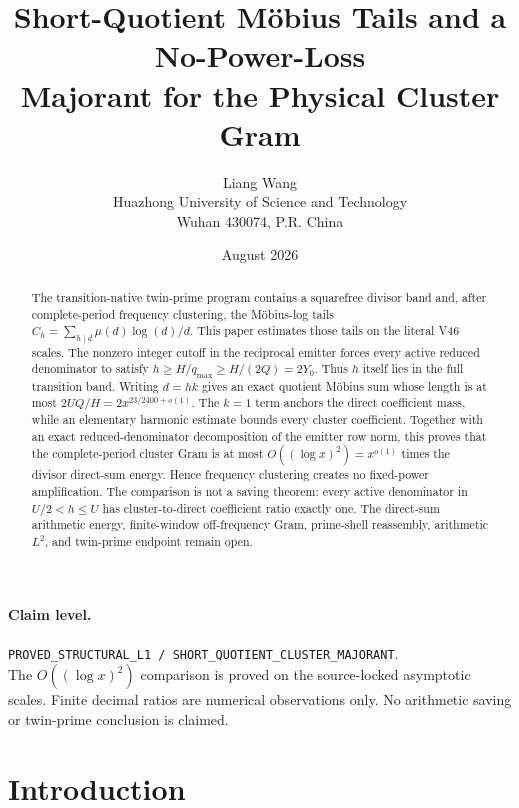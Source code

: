 \documentclass[11pt]{article}
\title{\textbf{Short-Quotient M\"obius Tails and a No-Power-Loss\\
Majorant for the Physical Cluster Gram}}
\author{Liang Wang\\
Huazhong University of Science and Technology\\
Wuhan 430074, P.R. China}
\date{August 2026}
\theoremstyle{definition}
\theoremstyle{remark}
\begin{document}
\maketitle

\begin{abstract}
The transition-native twin-prime program contains a squarefree divisor band
and, after complete-period frequency clustering, the M\"obius-log tails
\(
C_h=\sum_{h\mid d}\mu(d)\log(d)/d.
\)
This paper estimates those tails on the literal V46 scales.  The nonzero
integer cutoff in the reciprocal emitter forces every active reduced
denominator to satisfy
\(h\ge H/q_{\max}\ge H/(2Q)=2Y_0\).
Thus $h$ itself lies in the full transition band.  Writing $d=hk$ gives an
exact quotient M\"obius sum whose length is at most
\(2UQ/H=2x^{23/2400+o(1)}\).  The $k=1$ term anchors the direct coefficient
mass, while an elementary harmonic estimate bounds every cluster coefficient.
Together with an exact reduced-denominator decomposition of the emitter row
norm, this proves that the complete-period cluster Gram is at most
\(O((\log x)^2)=x^{o(1)}\) times the divisor direct-sum energy.  Hence
frequency clustering creates no fixed-power amplification.  The comparison
is not a saving theorem: every active denominator in $U/2<h\le U$ has
cluster-to-direct coefficient ratio exactly one.  The direct-sum arithmetic
energy, finite-window off-frequency Gram, prime-shell reassembly, arithmetic
$L^2$, and twin-prime endpoint remain open.
\end{abstract}

\paragraph{Claim level.}
\texttt{PROVED\_STRUCTURAL\_L1 / SHORT\_QUOTIENT\_CLUSTER\_MAJORANT}.\\
The $O((\log x)^2)$ comparison is proved on the source-locked asymptotic
scales.  Finite decimal ratios are numerical observations only.  No
arithmetic saving or twin-prime conclusion is claimed.

\section{Introduction}
\end{document}
